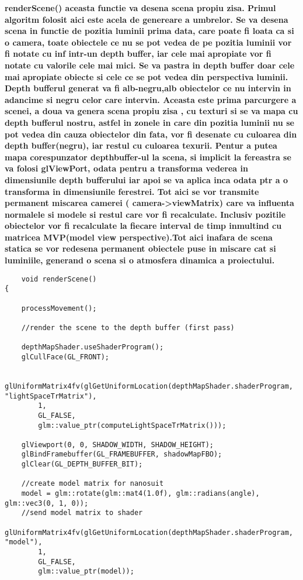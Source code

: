 \begin{itemize}
	\tab \tab \bf{renderScene()} aceasta functie va desena scena propiu zisa. Primul algoritm folosit aici este acela de genereare a umbrelor. Se va desena scena in functie de pozitia luminii prima data, care poate fi loata ca si o camera, toate obiectele ce nu se pot vedea de pe pozitia luminii vor fi notate cu inf intr-un depth buffer, iar cele mai apropiate vor fi notate cu valorile cele mai mici. Se va pastra in depth buffer doar cele mai apropiate obiecte si cele ce se pot vedea din perspectiva luminii. Depth bufferul generat va fi alb-negru,alb obiectelor ce nu intervin in adancime si negru celor care intervin. Aceasta este prima parcurgere a scenei, a doua va genera scena propiu zisa , cu texturi si se va mapa cu depth bufferul nostru, astfel in zonele in care din pozitia luminii nu se pot vedea din cauza obiectelor din fata, vor fi desenate cu culoarea din depth buffer(negru), iar restul cu culoarea texurii. Pentur a putea mapa corespunzator depthbuffer-ul la scena, si implicit la fereastra se va folosi glViewPort, odata pentru a transforma vederea in dimensiunile depth bufferului iar apoi se va aplica inca odata ptr a o transforma in dimensiunile ferestrei. Tot aici se vor transmite permanent miscarea camerei ( camera->viewMatrix) care va influenta normalele si modele si restul care vor fi recalculate. Inclusiv pozitile obiectelor vor fi recalculate la fiecare interval de timp inmultind cu matricea MVP(model view perspective).Tot aici inafara de scena statica se vor redesena permanent obiectele puse in miscare cat si luminiile, generand o scena si o atmosfera dinamica a proiectului.\\
	
	\begin{verbatim}
	void renderScene()
{

	processMovement();	

	//render the scene to the depth buffer (first pass)
	
	depthMapShader.useShaderProgram();
	glCullFace(GL_FRONT);
	
	glUniformMatrix4fv(glGetUniformLocation(depthMapShader.shaderProgram, "lightSpaceTrMatrix"),
		1,
		GL_FALSE,
		glm::value_ptr(computeLightSpaceTrMatrix()));
		
	glViewport(0, 0, SHADOW_WIDTH, SHADOW_HEIGHT);
	glBindFramebuffer(GL_FRAMEBUFFER, shadowMapFBO);
	glClear(GL_DEPTH_BUFFER_BIT);
	
	//create model matrix for nanosuit
	model = glm::rotate(glm::mat4(1.0f), glm::radians(angle), glm::vec3(0, 1, 0));	
	//send model matrix to shader
	glUniformMatrix4fv(glGetUniformLocation(depthMapShader.shaderProgram, "model"),
		1,
		GL_FALSE,
		glm::value_ptr(model));


\end{verbatim}
\end{itemize}

